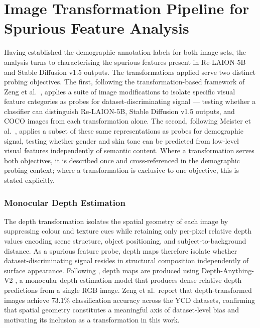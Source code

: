 \newpage\section{Image Transformation Pipeline for Spurious Feature Analysis}

Having established the demographic annotation labels for both image sets, 
the analysis turns to characterising the spurious features present in 
Re-LAION-5B and Stable Diffusion v1.5 outputs. The transformations applied 
serve two distinct probing objectives. The first, following the 
transformation-based framework of Zeng et al.\ 
\cite{Zeng_2024_UnderstandingBiasinLargeScaleVisualDatasets}, applies a 
suite of image modifications to isolate specific visual feature categories 
as probes for dataset-discriminating signal — testing whether a classifier 
can distinguish Re-LAION-5B, Stable Diffusion v1.5 outputs, and COCO images 
from each transformation alone. The second, following Meister et al.\ 
\cite{Meister_2023_GenderArtifactsinVisualDatasets}, applies a subset of 
these same representations as probes for demographic signal, testing whether 
gender and skin tone can be predicted from low-level visual features 
independently of semantic content. Where a transformation serves both 
objectives, it is described once and cross-referenced in the demographic 
probing context; where a transformation is exclusive to one objective, this 
is stated explicitly.

\subsubsection{Monocular Depth Estimation}\label{subsec:depth}

The depth transformation isolates the spatial geometry of each image by 
suppressing colour and texture cues while retaining only per-pixel relative 
depth values encoding scene structure, object positioning, and 
subject-to-background distance. As a spurious feature probe, depth maps 
therefore isolate whether dataset-discriminating signal resides in structural 
composition independently of surface appearance. Following 
\cite{Zeng_2024_UnderstandingBiasinLargeScaleVisualDatasets}, depth maps are 
produced using Depth-Anything-V2 \cite{Yang_2024_DepthAnythingV2}, a monocular 
depth estimation model that produces dense relative depth predictions from a 
single RGB image. Zeng et al.\ report that depth-transformed images achieve 
73.1\% classification accuracy across the YCD datasets, confirming that 
spatial geometry constitutes a meaningful axis of dataset-level bias and 
motivating its inclusion as a transformation in this work.

